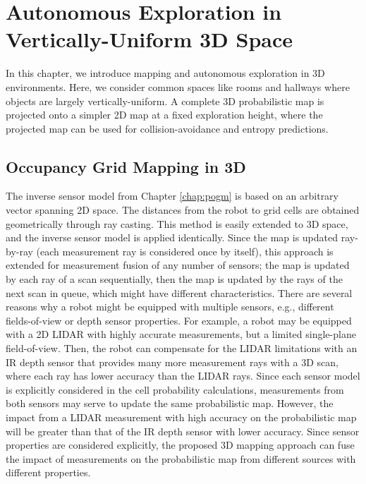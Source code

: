 
\chapter{Autonomous Exploration in Vertically-Uniform 3D Space} \label{chap:ae3Dsimple}

In this chapter, we introduce mapping and autonomous exploration in 3D environments. Here, we consider common spaces like rooms and hallways where objects are largely vertically-uniform. A complete 3D probabilistic map is projected onto a simpler 2D map at a fixed exploration height, where the projected map can be used for collision-avoidance and entropy predictions.

\section{Occupancy Grid Mapping in 3D}

The inverse sensor model from Chapter \ref{chap:pogm} is based on an arbitrary vector spanning 2D space. The distances from the robot to grid cells are obtained geometrically through ray casting. This method is easily extended to 3D space, and the inverse sensor model is applied identically. Since the map is updated ray-by-ray (each measurement ray is considered once by itself), this approach is extended for measurement fusion of any number of sensors; the map is updated by each ray of a scan sequentially, then the map is updated by the rays of the next scan in queue, which might have different characteristics. There are several reasons why a robot might be equipped with multiple sensors, e.g., different fields-of-view or depth sensor properties. For example, a robot may be equipped with a 2D LIDAR with highly accurate measurements, but a limited single-plane field-of-view. Then, the robot can compensate for the LIDAR limitations with an IR depth sensor that provides many more measurement rays with a 3D scan, where each ray has lower accuracy than the LIDAR rays. Since each sensor model is explicitly considered in the cell probability calculations, measurements from both sensors may serve to update the same probabilistic map. However, the impact from a LIDAR measurement with high accuracy on the probabilistic map will be greater than that of the IR depth sensor with lower accuracy. Since sensor properties are considered explicitly, the proposed 3D mapping approach can fuse the impact of measurements on the probabilistic map from different sources with different properties.


